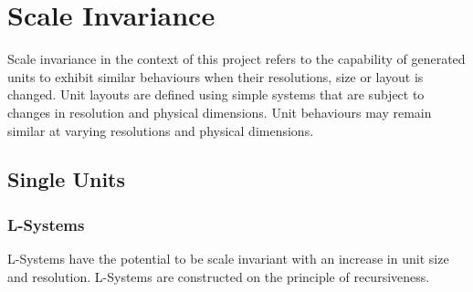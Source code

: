 \section{Scale Invariance}

Scale invariance in the context of this project refers to the capability of generated units to exhibit similar behaviours when their resolutions, size or layout is changed.
Unit layouts are defined using simple systems that are subject to changes in resolution and physical dimensions. Unit behaviours may remain similar at varying resolutions and physical dimensions. 

\subsection{Single Units}

\subsubsection{L-Systems}

L-Systems have the potential to be scale invariant with an increase in unit size and resolution. L-Systems are constructed on the principle of recursiveness. 